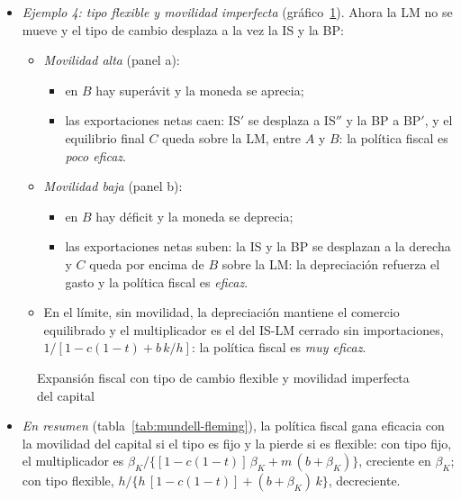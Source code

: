 \documentclass[11pt]{article}
\begin{document}
\begin{itemize}
\item \emph{Ejemplo 4: tipo flexible y movilidad imperfecta} (gráfico~\ref{fig:mf-flexible-imperfecta}). Ahora la LM no se mueve y el tipo de cambio desplaza a la vez la IS y la BP:
  \begin{itemize}
  \item \emph{Movilidad alta} (panel a):
    \begin{itemize}
    \item en $B$ hay superávit y la moneda se aprecia;
    \item las exportaciones netas caen: IS$'$ se desplaza a IS$''$ y la BP a BP$'$, y el equilibrio final $C$ queda sobre la LM, entre $A$ y $B$: la política fiscal es \emph{poco eficaz}.
    \end{itemize}
  \item \emph{Movilidad baja} (panel b):
    \begin{itemize}
    \item en $B$ hay déficit y la moneda se deprecia;
    \item las exportaciones netas suben: la IS y la BP se desplazan a la derecha y $C$ queda por encima de $B$ sobre la LM: la depreciación refuerza el gasto y la política fiscal es \emph{eficaz}.
    \end{itemize}
  \item En el límite, sin movilidad, la depreciación mantiene el comercio equilibrado y el multiplicador es el del IS-LM cerrado sin importaciones, $1/[1-c(1-t)+b\,k/h]$: la política fiscal es \emph{muy eficaz}.
  \end{itemize}
\end{itemize}

\begin{figure}[H]
\centering
\caption{Expansión fiscal con tipo de cambio flexible y movilidad imperfecta del capital}\label{fig:mf-flexible-imperfecta}
\end{figure}

\begin{itemize}
\item \emph{En resumen} (tabla~\ref{tab:mundell-fleming}), la política fiscal gana eficacia con la movilidad del capital si el tipo es fijo y la pierde si es flexible: con tipo fijo, el multiplicador es $\beta_K/\{[1-c(1-t)]\,\beta_K+m\,(b+\beta_K)\}$, creciente en $\beta_K$; con tipo flexible, $h/\{h\,[1-c(1-t)]+(b+\beta_K)\,k\}$, decreciente.
\end{itemize}
\end{document}
